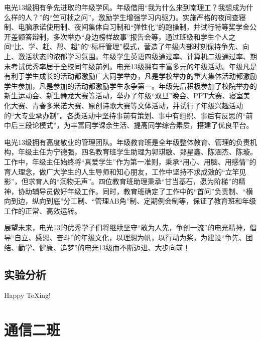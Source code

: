 \documentclass[a4paper,12pt]{report}
\begin{document}
\begin{spacing}{1.5}
电光13级拥有争先进取的年级学风。年级借用“我为什么来到南理工？我想成为什么样的人？”的“竺可桢之问”，激励学生增强学习内驱力。实施严格的夜间查寝制、电脑承诺使用制、夜间集体自习制和“弹性化”的跑操制，并试行特等奖学金公开差额答辩制，多次举办“身边榜样故事”报告会等，通过班级和学生个人之间“比、学、赶、帮、超”的“标杆管理”模式，营造了年级内部时刻保持争先、向上、激活状态的浓郁学习氛围。年级学生英语四级通过率、计算机二级通过率、期末考试优秀率居于全校同年级前列。电光13级拥有丰富多元的年级活动。年级凡是有利于学生成长的活动都激励广大同学举办，凡是学校举办的重大集体活动都激励学生参加，凡是参加的活动都激励学生永争第一。年级先后积极参加了校院举办的新生运动会、新生舞龙大赛等活动，举办了年级“双旦”晚会、PPT大赛、寝室美化大赛、青春多米诺大赛、原创诗歌大赛等文体活动，并试行了年级兴趣活动的“大专业承办制”。各类活动中坚持事前有策划、事中有组织、事后有反思的“前中后三段论模式”，为丰富同学课余生活、提高同学综合素质，搭建了优良平台。

电光13级拥有高度敬业的管理团队。年级教育班是全年级整体教育、管理的负责机构，年级主任为宁德强，四名教育班学生助理为郭琪敏、郑星鑫、陈涵杰、陈璇。工作中，年级主任始终将“真爱学生”作为第一准则，秉承“用心、用脑、用感情”的育人理念，做广大学生的人生导师和知心朋友，工作中坚持不求成效的“立竿见影”，但求育人的“润物无声”。四位教育班助理秉承“甘当基石，愿为阶梯”的精神，协助辅导员做好年级工作。同时，教育班确定了工作中的“首问”负责制、“横向到边，纵向到底”分工制、“管理AB角”制、定期例会制等，保证了教育班和年级工作的正常、高效运转。

展望未来，电光13的优秀学子们将继续坚守“敢为人先，争创一流”的电光精神，倡导“自立、感恩、奋斗”的年级文化，以理想为帆，以行动为桨，为建设“争先、团结、勤学、健康、追梦”的电光13级而不断迈进、大步向前！

\section{实验分析}
Happy TeXing!
\end{spacing}

\chapter{通信二班}
\end{document}
